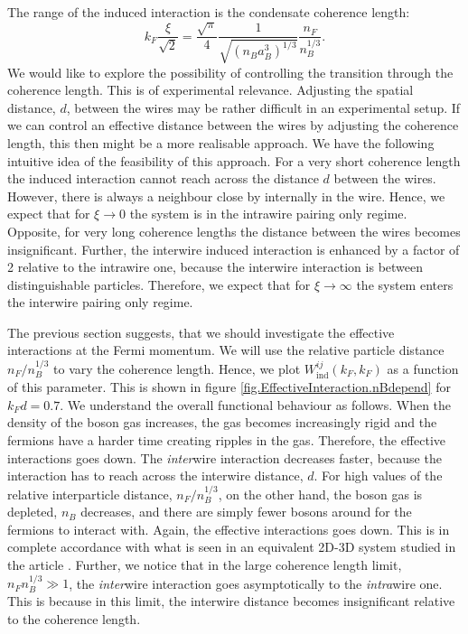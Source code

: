 The range of the induced interaction is the condensate coherence length:
\begin{equation}
k_F\frac{\xi}{\sqrt{2}} = \frac{\sqrt{\pi}}{4}\frac{1}{\sqrt{(n_Ba_B^3)^{1/3}}}\frac{n_F}{n_B^{1/3}}.
\label{eq.RangefunctionofrBBnB}
\end{equation}
We would like to explore the possibility of controlling the transition through the coherence length. This is of experimental relevance. Adjusting the spatial distance, $d$, between the wires may be rather difficult in an experimental setup. If we can control an effective distance between the wires by adjusting the coherence length, this then might be a more realisable approach. We have the following intuitive idea of the feasibility of this approach. For a very short coherence length the induced interaction cannot reach across the distance $d$ between the wires. However, there is always a neighbour close by internally in the wire. Hence, we expect that for $\xi \to 0$ the system is in the intrawire pairing only regime. Opposite, for very long coherence lengths the distance between the wires becomes insignificant. Further, the interwire induced interaction is enhanced by a factor of 2 relative to the intrawire one, because the interwire interaction is between distinguishable particles. Therefore, we expect that for $\xi \to \infty$ the system enters the interwire pairing only regime. 

The previous section suggests, that we should investigate the effective interactions at the Fermi momentum. We will use the relative particle distance $n_F / n_B^{1/3}$ to vary the coherence length. Hence, we plot $W^{ij}_{\text{ind}}(k_F,k_F)$ as a function of this parameter. This is shown in figure \ref{fig.EffectiveInteraction.nBdepend} for $k_Fd = 0.7$. We understand the overall functional behaviour as follows. When the density of the boson gas increases, the gas becomes increasingly rigid and the fermions have a harder time creating ripples in the gas. Therefore, the effective interactions goes down. The \textit{inter}wire interaction decreases faster, because the interaction has to reach across the interwire distance, $d$. For high values of the relative interparticle distance, $n_F / n_B^{1/3}$, on the other hand, the boson gas is depleted, $n_B$ decreases, and there are simply fewer bosons around for the fermions to interact with. Again, the effective interactions goes down. This is in complete accordance with what is seen in an equivalent 2D-3D system studied in the article \cite{BruunZhigangTopSuperfluid}. Further, we notice that in the large coherence length limit, $n_Fn_B^{1/3} \gg 1$, the \textit{inter}wire interaction goes asymptotically to the \textit{intra}wire one. This is because in this limit, the interwire distance becomes insignificant relative to the coherence length. 

